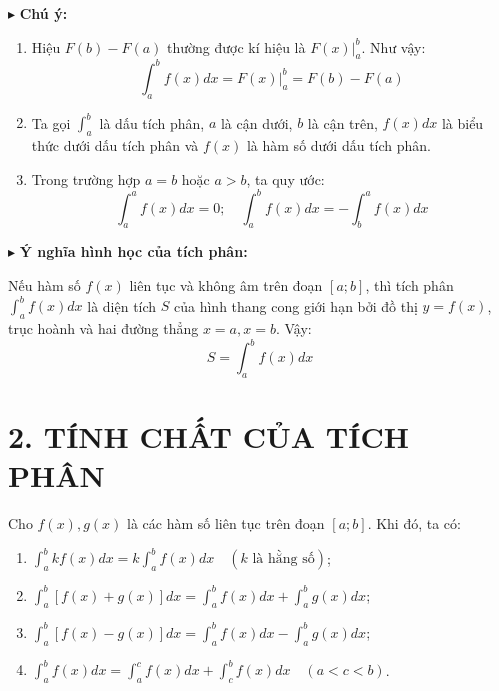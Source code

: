 \documentclass[12pt,a4paper]{extarticle}
\begin{document}
\vspace{1em}
\noindent $\blacktriangleright$ \textbf{Chú ý:}
\begin{center}
    \begin{minipage}{\textwidth}
        \begin{enumerate}[label=\alph*), leftmargin=*, itemsep=0.8em]
            \item Hiệu $F(b) - F(a)$ thường được kí hiệu là $F(x)\big|_a^b$. Như vậy:
            \[
            \int_a^b f(x)dx = F(x)\Big|_a^b = F(b) - F(a)
            \]
            \item Ta gọi $\displaystyle \int_a^b$ là dấu tích phân, $a$ là cận dưới, $b$ là cận trên, $f(x)dx$ là biểu thức dưới dấu tích phân và $f(x)$ là hàm số dưới dấu tích phân.
            \item Trong trường hợp $a = b$ hoặc $a > b$, ta quy ước:
            \[
            \int_a^a f(x)dx = 0; \quad \int_a^b f(x)dx = -\int_b^a f(x)dx
            \]
        \end{enumerate}
    \end{minipage}
\end{center}

\vspace{1.5em}
\noindent $\blacktriangleright$ \textbf{Ý nghĩa hình học của tích phân:}
\par Nếu hàm số $f(x)$ liên tục và không âm trên đoạn $[a; b]$, thì tích phân $\displaystyle \int_a^b f(x)dx$ là diện tích $S$ của hình thang cong giới hạn bởi đồ thị $y = f(x)$, trục hoành và hai đường thẳng $x = a, x = b$. Vậy:
\[
S = \int_a^b f(x)dx
\]

\vspace{2.5em}

\section*{\color{blue!80!black}2. TÍNH CHẤT CỦA TÍCH PHÂN}

\noindent Cho $f(x), g(x)$ là các hàm số liên tục trên đoạn $[a; b]$. Khi đó, ta có:
\begin{enumerate}[label=\arabic*), leftmargin=*, itemsep=0.8em]
    \item $\displaystyle \int_a^b kf(x)dx = k\int_a^b f(x)dx \quad (k \text{ là hằng số})$;
    \item $\displaystyle \int_a^b [f(x) + g(x)]dx = \int_a^b f(x)dx + \int_a^b g(x)dx$;
    \item $\displaystyle \int_a^b [f(x) - g(x)]dx = \int_a^b f(x)dx - \int_a^b g(x)dx$;
    \item $\displaystyle \int_a^b f(x)dx = \int_a^c f(x)dx + \int_c^b f(x)dx \quad (a < c < b)$.
\end{enumerate}
\end{document}
